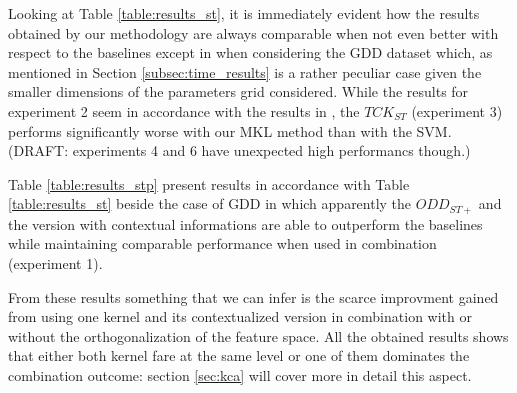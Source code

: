 Looking at Table \ref{table:results_st}, it is immediately evident how the results
obtained by our methodology are always comparable when not even better with respect
to the baselines except in when considering the GDD dataset which, as mentioned in
Section \ref{subsec:time_results} is a rather peculiar case given the smaller dimensions
of the parameters grid considered.
While the results for experiment 2 seem in accordance with the results in \cite{gmkl},
the $TCK_{ST}$ (experiment 3) performs significantly worse with our MKL method than with
the SVM.
(DRAFT: experiments 4 and 6 have unexpected high performancs though.)

Table \ref{table:results_stp} present results in accordance with Table \ref{table:results_st}
beside the case of GDD in which apparently the $ODD_{ST+}$ and the version with
contextual informations are able to outperform the baselines while maintaining
comparable performance when used in combination (experiment 1).

From these results something that we can infer is the scarce improvment gained from
using one kernel and its contextualized version in combination with or without
the orthogonalization of the feature space.
All the obtained results shows that either both kernel fare at the same level or
one of them dominates the combination outcome: section \ref{sec:kca} will cover
more in detail this aspect.

